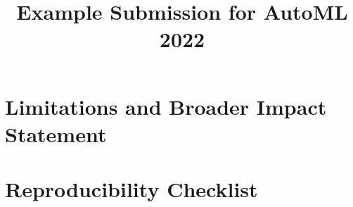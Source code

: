 \documentclass[11pt]{article}
\title{Example Submission for AutoML 2022}
\author[1]{\nameemail{Author 1}{email1@example.com}}
\affil[1]{Institution 1}
\begin{document}
\maketitle

\begin{abstract}
\end{abstract}

\section{Limitations and Broader Impact Statement}

%

%

\section{Reproducibility Checklist}
\end{document}
